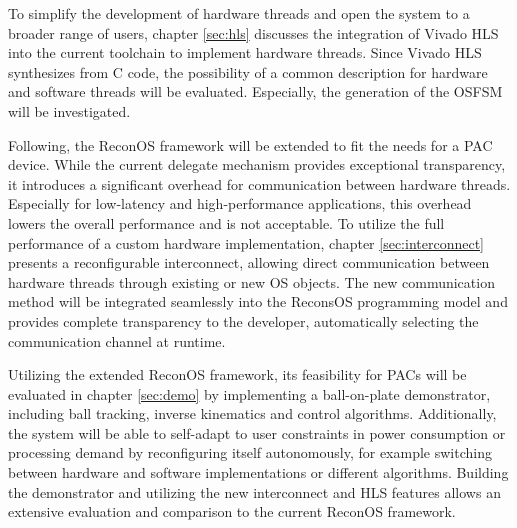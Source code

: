 To simplify the development of hardware threads and open the system to a
broader range of users, chapter \ref{sec:hls} discusses the integration of
Vivado HLS into the current toolchain to implement hardware threads. Since
Vivado HLS synthesizes from C code, the possibility of a common description
for hardware and software threads will be evaluated. Especially, the
generation of the \ac{OSFSM} will be investigated.

Following, the ReconOS framework will be extended to fit the needs for a
\ac{PAC} device. While the current delegate mechanism provides exceptional
transparency, it introduces a significant overhead for communication between
hardware threads. Especially for low-latency and high-performance
applications, this overhead lowers the overall performance and is not
acceptable. To utilize the full performance of a custom hardware
implementation, chapter \ref{sec:interconnect} presents a reconfigurable
interconnect, allowing direct communication between hardware threads through
existing or new \ac{OS} objects. The new communication method will be
integrated seamlessly into the ReconsOS programming model and provides
complete transparency to the developer, automatically selecting the
communication channel at runtime.

Utilizing the extended ReconOS framework, its feasibility for \acp{PAC} will
be evaluated in chapter \ref{sec:demo} by implementing a ball-on-plate
demonstrator, including ball tracking, inverse kinematics and control
algorithms. Additionally, the system will be able to self-adapt to user
constraints in power consumption or processing demand by reconfiguring itself
autonomously, for example switching between hardware and software
implementations or different algorithms. Building the demonstrator and
utilizing the new interconnect and \ac{HLS} features allows an extensive
evaluation and comparison to the current ReconOS framework.